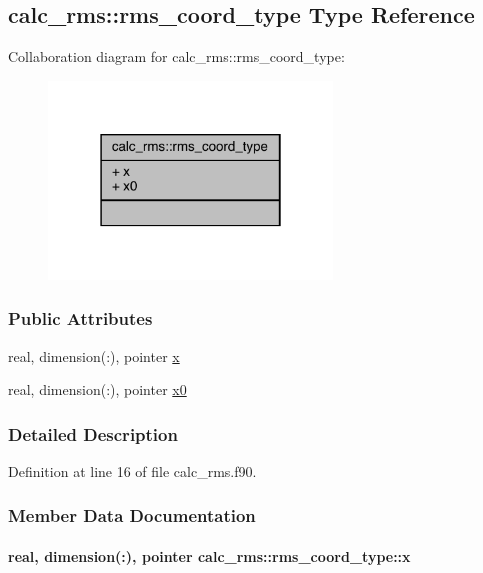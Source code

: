 \hypertarget{structcalc__rms_1_1rms__coord__type}{\subsection{calc\-\_\-rms\-:\-:rms\-\_\-coord\-\_\-type Type Reference}
\label{structcalc__rms_1_1rms__coord__type}
}


Collaboration diagram for calc\-\_\-rms\-:\-:rms\-\_\-coord\-\_\-type\-:
\nopagebreak
\begin{figure}[H]
\begin{center}
\leavevmode
\includegraphics[width=214pt]{structcalc__rms_1_1rms__coord__type__coll__graph}
\end{center}
\end{figure}
\subsubsection*{Public Attributes}
\begin{DoxyCompactItemize}
\item 
real, dimension(\-:), pointer \hyperlink{structcalc__rms_1_1rms__coord__type_a7d2b5b2cfe656be3662a045073f80a13}{x}
\item 
real, dimension(\-:), pointer \hyperlink{structcalc__rms_1_1rms__coord__type_a641692e4616daf83f768d278e1c54b2e}{x0}
\end{DoxyCompactItemize}


\subsubsection{Detailed Description}


Definition at line 16 of file calc\-\_\-rms.\-f90.



\subsubsection{Member Data Documentation}
\hypertarget{structcalc__rms_1_1rms__coord__type_a7d2b5b2cfe656be3662a045073f80a13}{
\paragraph[{x}]{\setlength{\rightskip}{0pt plus 5cm}real, dimension(\-:), pointer calc\-\_\-rms\-::rms\-\_\-coord\-\_\-type\-::x}}\label{structcalc__rms_1_1rms__coord__type_a7d2b5b2cfe656be3662a045073f80a13}


